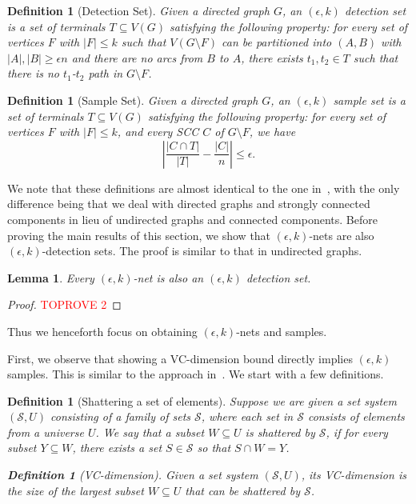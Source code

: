 \documentclass[11pt]{article}
\newtheorem{lemma}[theorem]{Lemma}
\newtheorem{definition}[theorem]{Definition}
\renewcommand{\SS}{\mathcal{S}}
\begin{document}
\begin{definition}[Detection Set]\label{def:detection_set}
Given a directed graph $G$, an $(\epsilon, k)$ detection set is a set of terminals $T \subseteq V(G)$ satisfying the following property: for every set of vertices $F$ with $|F| \leq k$ such that $V(G \setminus F)$ can be partitioned into $(A,B)$ with $|A|, |B| \geq \epsilon n$ and there are no arcs from $B$ to $A$, there exists $t_1, t_2 \in T$ such that there is no $t_1$-$t_2$ path in $G \setminus F$.
\end{definition}

\begin{definition}[Sample Set]\label{def:sample_set}
Given a directed graph $G$, an $(\epsilon, k)$ sample set is a set of terminals $T \subseteq V(G)$ satisfying the following property: for every set of vertices $F$ with $|F| \leq k$, and every SCC $C$ of $G \setminus F$, we have 
$$\left |\frac{|C \cap T|}{|T|} - \frac{|C|}{n}\right | \leq \epsilon.$$

\end{definition}
We note that these definitions are almost identical to the one in~\cite{fm06}, with the only difference being that we deal with directed graphs and strongly connected components in lieu of undirected graphs and connected components. Before proving the main results of this section, we show that $(\epsilon,k)$-nets are also $(\epsilon,k)$-detection sets. The proof is similar to that in undirected graphs.

\begin{lemma}
Every $(\epsilon, k)$-net is also an $(\epsilon,k)$ detection set.

\end{lemma}

\begin{proof}\textcolor{red}{TOPROVE 2}\end{proof}



Thus we henceforth focus on obtaining $(\epsilon,k)$-nets and samples.




First, we observe that showing a VC-dimension bound directly implies $(\epsilon,k)$ samples. This is similar to the approach in~\cite{fm06}. We start with a few definitions.

\begin{definition}[Shattering a set of elements] Suppose we are given a set system $(\SS, U)$ consisting of a family of sets $\SS$, where each set in $\SS$ consists of elements from a universe $U$. We say that a subset $W \subseteq U$ is \emph{shattered} by $\SS$, if for every subset $Y \subseteq W$, there exists a set $S \in \SS$ so that $S \cap W = Y$.

\begin{definition}[VC-dimension]
Given a set system $(\SS, U)$, its VC-dimension is the size of the largest subset $W \subseteq U$ that can be shattered by $\SS$.    
\end{definition}



\end{definition}
\end{document}
